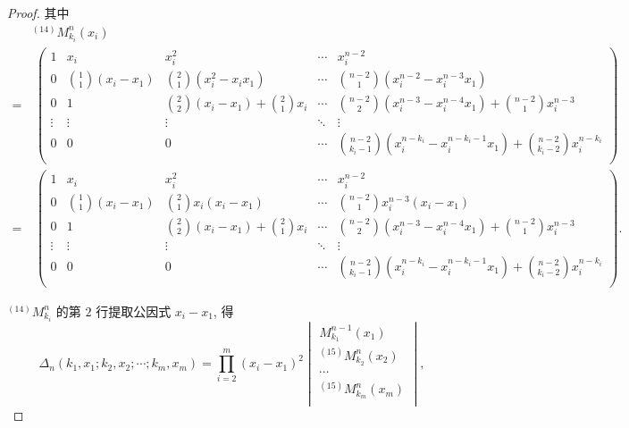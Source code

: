 \documentclass{ctexart}
\begin{document}
\begin{proof}
    其中
    \begin{align*}
        & ^{(14)}M_{k_i}^n(x_i) \\
        = & \ \begin{pmatrix}
            1 & x_i & x_i^2 & \cdots & x_i^{n-2} \\[4pt]
            0 & \binom{1}{1}(x_i-x_1) & \binom{2}{1}(x_i^2-x_ix_1) & \cdots & \binom{n-2}{1}(x_i^{n-2}-x_i^{n-3}x_1) \\[10pt]
            0 & 1 & \binom{2}{2}(x_i-x_1)+\binom{2}{1}x_i & \cdots & \binom{n-2}{2}(x_i^{n-3}-x_i^{n-4}x_1)+\binom{n-2}{1}x_i^{n-3} \\
            \vdots & \vdots & \vdots & \ddots & \vdots \\[4pt]
            0 & 0 & 0 & \cdots & \binom{n-2}{k_i-1}(x_i^{n-k_i}-x_i^{n-k_i-1}x_1)+\binom{n-2}{k_i-2}x_i^{n-k_i} \\
        \end{pmatrix} \\
        = & \ \begin{pmatrix}
            1 & x_i & x_i^2 & \cdots & x_i^{n-2} \\[4pt]
            0 & \binom{1}{1}(x_i-x_1) & \binom{2}{1}x_i(x_i-x_1) & \cdots & \binom{n-2}{1}x_i^{n-3}(x_i-x_1) \\[10pt]
            0 & 1 & \binom{2}{2}(x_i-x_1)+\binom{2}{1}x_i & \cdots & \binom{n-2}{2}(x_i^{n-3}-x_i^{n-4}x_1)+\binom{n-2}{1}x_i^{n-3} \\
            \vdots & \vdots & \vdots & \ddots & \vdots \\[4pt]
            0 & 0 & 0 & \cdots & \binom{n-2}{k_i-1}(x_i^{n-k_i}-x_i^{n-k_i-1}x_1)+\binom{n-2}{k_i-2}x_i^{n-k_i} \\
        \end{pmatrix}.
    \end{align*}

    $^{(14)}M_{k_i}^n$ 的第 $2$ 行提取公因式 $x_i-x_1$, 得
    \[\Delta_n(k_1,x_1;k_2,x_2;\cdots;k_m,x_m)=\prod\limits_{i=2}^m(x_i-x_1)^{2}\begin{vmatrix}
        M_{k_1}^{n-1}(x_1) \\
        ^{(15)}M_{k_2}^n(x_2) \\
        \cdots \\
        ^{(15)}M_{k_m}^n(x_m) \\
    \end{vmatrix},\]


\end{proof}
\end{document}
